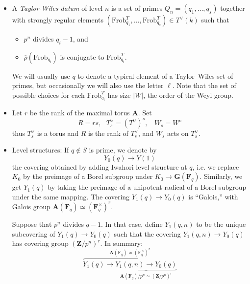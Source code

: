 \documentclass[10pt]{amsart}
\newcommand{\Z}{\mathbf{Z}}
\newcommand{\rhobar}{\overline{\rho}}
\newcommand{\Frob}{\mathrm{Frob}}
\newcommand{\ramprimes}{S}
\theoremstyle{remark}
\newcommand{\F}{\mathbf{F}}
\newcommand{\TT}{\mathbf{A}}
\newcommand{\GG}{\mathbf{G}}
\begin{document}
\begin{itemize}

\item[-]   A {\em Taylor-Wiles datum} of level $n$ is   a set of primes $Q_n = (q_1, \dots, q_s)$  together with strongly regular elements $(\Frob_{q_1}^T, \dots, \Frob_{q_s}^T) \in T^{\vee}(k)$  \index{$\Frob_q^T$}
 such that 
\begin{itemize}
\item[-]    $p^{n}$ divides $q_i-1$, and 
\item[-]  $\rhobar(\Frob_{q_i})$ is  conjugate to  $\Frob_{q_i}^T$.
\end{itemize} 
  
 We will usually use $q$ to denote a typical element of a Taylor--Wiles set of primes, but occasionally we will also use the letter $\ell$.
Note that the set of possible choices for each $\Frob_{q_i}^T$ has size $|W|$, the order of the Weyl group. 

  
 

 



\item[-] 
Let $r$ be the rank of the maximal torus $\TT$. Set \begin{equation}  \label{Tsdef}  R=rs, \ \ \ T^{\vee}_s = (T^{\vee})^s, \ \ \ \  W_s = W^s \end{equation} 
 thus $T^{\vee}_s$ is a torus and $R$ is the rank of $T^{\vee}_s$, and $W_s$ acts on $T^{\vee}_s$.   
  

\item[-]  Level structures: 
If $q \notin \ramprimes$ is prime, we denote by   
\begin{equation} \label{Y0ldef} Y_0(q) \rightarrow Y(1)\end{equation} 
the covering obtained by adding Iwahori level structure at $q$, i.e. we replace $K_0$
by the preimage of a Borel subgroup under $K_0 \rightarrow \GG(\F_{q})$. 
Similarly, we get $Y_1(q)$ by taking the preimage of a unipotent radical of a Borel subgroup under the same mapping.  
The covering $Y_1(q) \rightarrow Y_0(q)$ is ``Galois,'' with Galois group $ \mathbf{A}(\mathbf{F}_{q}) \simeq (\mathbf{F}_{q}^{\times})^r$.
 

  Suppose that  $p^{n}$ divides $q-1$. In that case,  define $Y_1(q,n) $ to be   
the unique subcovering of $Y_1(q) \rightarrow Y_0(q)$ such that
the covering $Y_1(q, n) \rightarrow Y_0(q)$
has covering group $(\Z/p^n)^{r}$. In summary:
\begin{equation} \label{Y1def}  \overbrace{ Y_1(q) \rightarrow  \underbrace{ Y_1(q, n) \rightarrow Y_0(q)}_{\mathbf{A}(\mathbf{F}_{q})/p^n \simeq (\Z/p^n)^{r}}}^{ \mathbf{A}(\mathbf{F}_{q}) \simeq (\mathbf{F}_{q}^{\times})^{r}} \end{equation}
 


\end{itemize}
\end{document}
